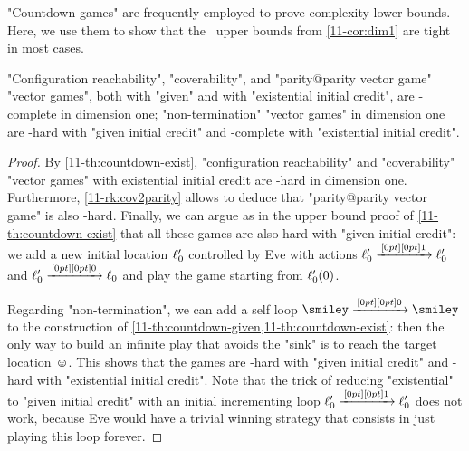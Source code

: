 "Countdown games" are frequently employed to prove complexity lower
bounds.  Here, we use them to show that the \EXPSPACE\ upper bounds
from \cref{11-cor:dim1} are tight in most cases.
\begin{theorem}
\label{11-th:dim1}
  "Configuration reachability", "coverability", and "parity@parity
  vector game" "vector games", both with "given" and with "existential
  initial credit", are \EXPSPACE-complete in dimension one;
  "non-termination" "vector games" in dimension one are \EXP-hard with
  "given initial credit" and \EXPSPACE-complete with "existential
  initial credit".
\end{theorem}
\begin{proof}
  By \cref{11-th:countdown-exist}, "configuration reachability" and
  "coverability" "vector games" with existential initial credit
  are \EXPSPACE-hard in dimension one.
  Furthermore, \cref{11-rk:cov2parity} allows to deduce that
  "parity@parity vector game" is also \EXPSPACE-hard.  Finally, we can
  argue as in the upper bound proof of \cref{11-th:countdown-exist} that
  all these games are also hard with "given initial credit": we add a
  new initial location $\ell'_0$ controlled by Eve with actions
  $\ell'_0\xrightarrow{\,[0pt][0pt]{\scriptsize{1}}\,}\ell'_0$ and $\ell'_0\xrightarrow{\,[0pt][0pt]{\scriptsize{0}}\,}\ell_0$ and play the game
  starting from $\ell'_0(0)$.

  Regarding "non-termination", we can add a self loop $\smiley\step
  0\smiley$ to the construction
  of \cref{11-th:countdown-given,11-th:countdown-exist}: then the only way
  to build an infinite play that avoids the "sink" is to reach the
  target location $\smiley$.  This shows that the games are \EXP-hard
  with "given initial credit" and \EXPSPACE-hard with "existential
  initial credit".  Note that the trick of reducing "existential" to
  "given initial credit" with an initial incrementing loop $\ell'_0\xrightarrow{\,[0pt][0pt]{\scriptsize{1}}\,}\ell'_0$ does not work, because Eve would have a trivial winning
  strategy that consists in just playing this loop forever.
\end{proof}


